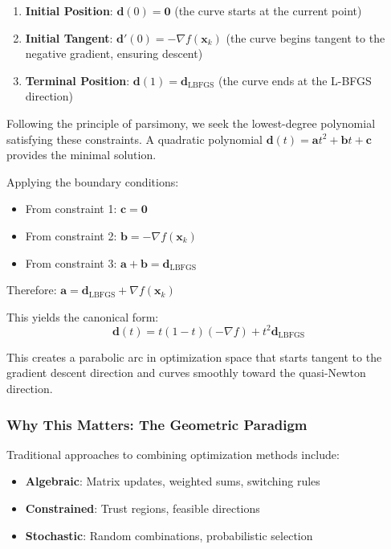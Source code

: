 \begin{enumerate}
\def\labelenumi{\arabic{enumi}.}
\item
  \textbf{Initial Position}: \(\mathbf{d}(0) = \mathbf{0}\) (the curve starts at the current point)
\item
  \textbf{Initial Tangent}: \(\mathbf{d}'(0) = -\nabla f(\mathbf{x}_k)\) (the curve begins tangent to the negative gradient, ensuring descent)
\item
  \textbf{Terminal Position}: \(\mathbf{d}(1) = \mathbf{d}_{\text{LBFGS}}\) (the curve ends at the L-BFGS direction)
\end{enumerate}

Following the principle of parsimony, we seek the lowest-degree polynomial satisfying these constraints.
A quadratic polynomial \(\mathbf{d}(t) = \mathbf{a}t^2 + \mathbf{b}t + \mathbf{c}\) provides the minimal solution.

Applying the boundary conditions:

\begin{itemize}
\tightlist
\item
  From constraint 1: \(\mathbf{c} = \mathbf{0}\)
\item
  From constraint 2: \(\mathbf{b} = -\nabla f(\mathbf{x}_k)\)
\item
  From constraint 3: \(\mathbf{a} + \mathbf{b} = \mathbf{d}_{\text{LBFGS}}\)
\end{itemize}

Therefore: \(\mathbf{a} = \mathbf{d}_{\text{LBFGS}} + \nabla f(\mathbf{x}_k)\)

This yields the canonical form:
\[\mathbf{d}(t) = t(1-t)(-\nabla f) + t^2 \mathbf{d}_{\text{LBFGS}}\]

This creates a parabolic arc in optimization space that starts tangent to the gradient descent direction and curves smoothly toward the quasi-Newton direction.

\hypertarget{why-this-matters-the-geometric-paradigm}{%
\subsubsection{Why This Matters: The Geometric Paradigm}\label{why-this-matters-the-geometric-paradigm}}

Traditional approaches to combining optimization methods include:

\begin{itemize}
\tightlist
\item
  \textbf{Algebraic}: Matrix updates, weighted sums, switching rules
\item
  \textbf{Constrained}: Trust regions, feasible directions
\item
  \textbf{Stochastic}: Random combinations, probabilistic selection
\end{itemize}

